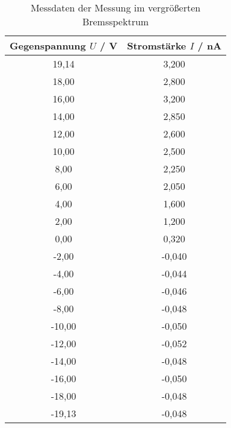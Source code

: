 \begin{table}[!htp]
\centering
\caption{Messdaten der Messung im vergrößerten Bremsspektrum}
\label{tab:messung2}
\begin{tabular}{c c}
\toprule
{Gegenspannung $U$ / V} & {Stromstärke $I$ / nA } \\
\midrule
19,14 & 3,200 \\
18,00 & 2,800 \\
16,00 & 3,200 \\
14,00 & 2,850 \\
12,00 & 2,600 \\
10,00 & 2,500 \\
8,00 & 2,250 \\
6,00 & 2,050 \\
4,00 & 1,600 \\
2,00 & 1,200 \\
0,00 & 0,320 \\
-2,00 & -0,040 \\
-4,00 & -0,044 \\
-6,00 & -0,046 \\
-8,00 & -0,048 \\
-10,00 & -0,050 \\
-12,00 & -0,052 \\
-14,00 & -0,048 \\
-16,00 & -0,050 \\
-18,00 & -0,048 \\
-19,13 & -0,048 \\
\bottomrule
\end{tabular}
\end{table}